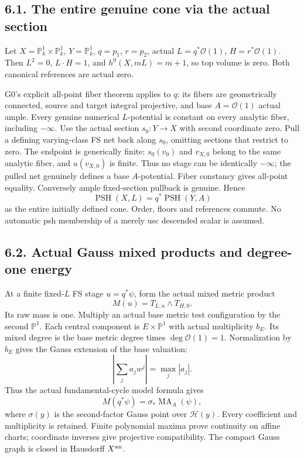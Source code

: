 \documentclass[
  10pt,
]{article}
\begin{document}
\subsection{6.1. The entire genuine cone via the actual
section}\label{the-entire-genuine-cone-via-the-actual-section}

Let \(X=\mathbb P^1_k\times\mathbb P^1_k\), \(Y=\mathbb P^1_k\),
\(q=p_1\), \(r=p_2\), actual \(L=q^*\mathcal O(1)\),
\(H=r^*\mathcal O(1)\). Then \(L^2=0\), \(L\cdot H=1\), and
\(h^0(X,mL)=m+1\), so top volume is zero. Both canonical references are
actual zero.

G0's explicit all-point fiber theorem applies to \(q\): its fibers are
geometrically connected, source and target integral projective, and base
\(A=\mathcal O(1)\) actual ample. Every genuine numerical
\(L\)-potential is constant on every analytic fiber, including
\(-\infty\). Use the actual section \(s_0:Y\to X\) with second
coordinate zero. Pull a defining varying-class FS net back along
\(s_0\), omitting sections that restrict to zero. The endpoint is
generically finite: \(s_0(v_0)\) and \(v_{X,0}\) belong to the same
analytic fiber, and \(u(v_{X,0})\) is finite. Thus no stage can be
identically \(-\infty\); the pulled net genuinely defines a base
\(A\)-potential. Fiber constancy gives all-point equality. Conversely
ample fixed-section pullback is genuine. Hence
\[\operatorname{PSH}(X,L)=q^*\operatorname{PSH}(Y,A) \tag{6.1}\] as the
entire initially defined cone. Order, floors and references commute. No
automatic psh membership of a merely usc descended scalar is assumed.

\subsection{6.2. Actual Gauss mixed products and degree-one
energy}\label{actual-gauss-mixed-products-and-degree-one-energy}

At a finite fixed-\(L\) FS stage \(u=q^*\psi\), form the actual mixed
metric product \[M(u)=T_{L,u}\wedge T_{H,0}. \tag{6.2}\] Its raw mass is
one. Multiply an actual base metric test configuration by the second
\(\mathbb P^1\). Each central component is \(E\times\mathbb P^1\) with
actual multiplicity \(b_E\). Its mixed degree is the base metric degree
times \(\deg\mathcal O(1)=1\). Normalization by \(b_E\) gives the Gauss
extension of the base valuation:
\[\left|\sum_j a_jw^j\right|=\max_j|a_j|. \tag{6.3}\] Thus the actual
fundamental-cycle model formula gives
\[M(q^*\psi)=\sigma_*\operatorname{MA}_A(\psi), \tag{6.4}\] where
\(\sigma(y)\) is the second-factor Gauss point over \(\mathcal H(y)\).
Every coefficient and multiplicity is retained. Finite polynomial maxima
prove continuity on affine charts; coordinate inverses give projective
compatibility. The compact Gauss graph is closed in Hausdorff
\(X^{\rm an}\).
\end{document}
